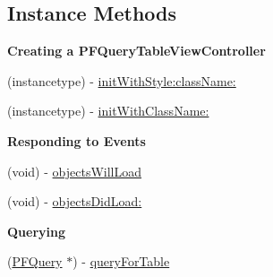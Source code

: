 \subsection*{Instance Methods}
\begin{Indent}{\bf Creating a P\+F\+Query\+Table\+View\+Controller}\par
{\em 

 

 }\begin{DoxyCompactItemize}
\item 
(instancetype) -\/ \hyperlink{interface_p_f_query_table_view_controller_aa65d2f84f753e2ff528d5bd7ee62374f}{init\+With\+Style\+:class\+Name\+:}
\item 
(instancetype) -\/ \hyperlink{interface_p_f_query_table_view_controller_a64c1e48cae146ebce855879c91f19cdf}{init\+With\+Class\+Name\+:}
\end{DoxyCompactItemize}
\end{Indent}
\begin{Indent}{\bf Responding to Events}\par
{\em 

 

 }\begin{DoxyCompactItemize}
\item 
(void) -\/ \hyperlink{interface_p_f_query_table_view_controller_a0eec6619963aeb275fcdb704fa6d8074}{objects\+Will\+Load}
\item 
(void) -\/ \hyperlink{interface_p_f_query_table_view_controller_ab2333be359021fd9cf681953732bb4a9}{objects\+Did\+Load\+:}
\end{DoxyCompactItemize}
\end{Indent}
\begin{Indent}{\bf Querying}\par
{\em 

 

 }\begin{DoxyCompactItemize}
\item 
(\hyperlink{interface_p_f_query}{P\+F\+Query} $\ast$) -\/ \hyperlink{interface_p_f_query_table_view_controller_af74b91d2b7e062d6404b7a585e1a043b}{query\+For\+Table}
\end{DoxyCompactItemize}
\end{Indent}

